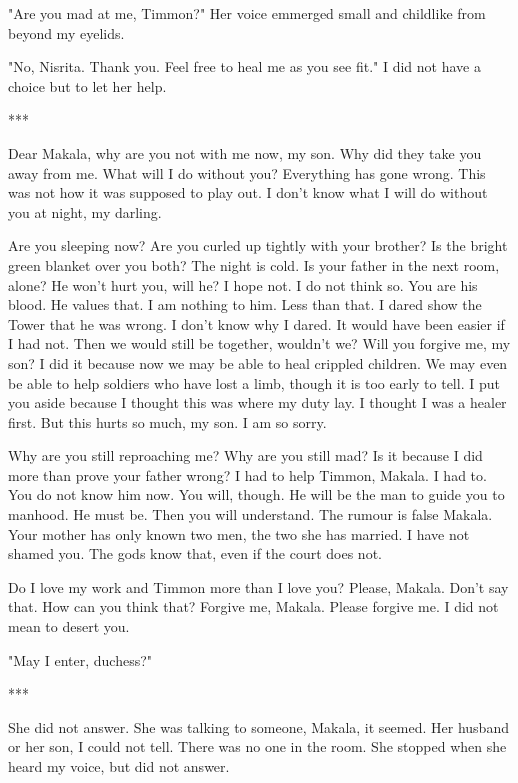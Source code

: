 \documentclass{article}
\begin{document}
"Are you mad at me, Timmon?" Her voice emmerged small and childlike from beyond my eyelids.

"No, Nisrita. Thank you. Feel free to heal me as you see fit." I did not have a choice but to let her help.

\vspace{.cm}
***

Dear Makala, why are you not with me now, my son. Why did they take you away from me. What will I do without you? Everything has gone wrong. This was not how it was supposed to play out. I don't know what I will do without you at night, my darling.

Are you sleeping now? Are you curled up tightly with your brother? Is the bright green blanket over you both? The night is cold. Is your father in the next room, alone? He won't hurt you, will he? I hope not. I do not think so. You are his blood. He values that. I am nothing to him. Less than that. I dared show the Tower that he was wrong. I don't know why I dared. It would have been easier if I had not. Then we would still be together, wouldn't we? Will you forgive me, my son? I did it because now we may be able to heal crippled children. We may even be able to help soldiers who have lost a limb, though it is too early to tell. I put you aside because I thought this was where my duty lay. I thought I was a healer first. But this hurts so much, my son. I am so sorry.

Why are you still reproaching me? Why are you still mad? Is it because I did more than prove your father wrong? I had to help Timmon, Makala. I had to. You do not know him now. You will, though. He will be the man to guide you to manhood. He must be. Then you will understand. The rumour is false Makala. Your mother has only known two men, the two she has married. I have not shamed you. The gods know that, even if the court does not. 

Do I love my work and Timmon more than I love you? Please, Makala. Don't say that. How can you think that? Forgive me, Makala. Please forgive me. I did not mean to desert you. 

"May I enter, duchess?"

\vpsace{.5cm}

***

She did not answer. She was talking to someone, Makala, it seemed. Her husband or her son, I could not tell. There was no one in the room. She stopped when she heard my voice, but did not answer.
\end{document}
